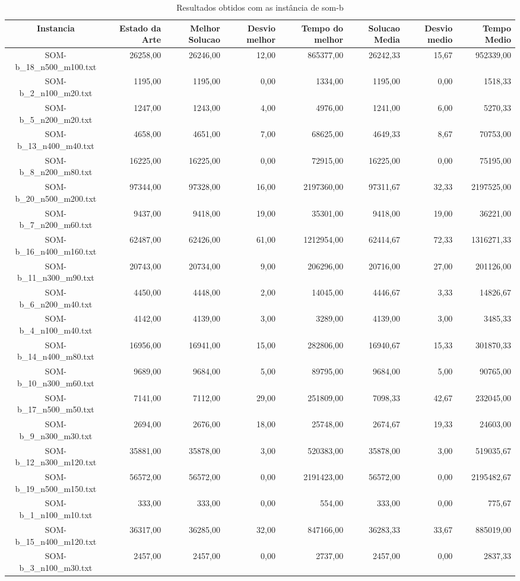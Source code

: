 \begin{landscape}
	\begin{table}[t]
	\centering
	\begin{tabular}{| c | r | r | r | r | r | r | r |  }
\hline
Instancia&Estado da Arte&Melhor Solucao&Desvio melhor&Tempo do melhor&Solucao Media&Desvio medio&Tempo Medio\\ \hline 
		SOM-b\_18\_n500\_m100.txt&26258,00&26246,00&12,00&865377,00&26242,33&15,67&952339,00\\
		SOM-b\_2\_n100\_m20.txt&1195,00&1195,00&0,00&1334,00&1195,00&0,00&1518,33\\
		SOM-b\_5\_n200\_m20.txt&1247,00&1243,00&4,00&4976,00&1241,00&6,00&5270,33\\
		SOM-b\_13\_n400\_m40.txt&4658,00&4651,00&7,00&68625,00&4649,33&8,67&70753,00\\
		SOM-b\_8\_n200\_m80.txt&16225,00&16225,00&0,00&72915,00&16225,00&0,00&75195,00\\
		SOM-b\_20\_n500\_m200.txt&97344,00&97328,00&16,00&2197360,00&97311,67&32,33&2197525,00\\
		SOM-b\_7\_n200\_m60.txt&9437,00&9418,00&19,00&35301,00&9418,00&19,00&36221,00\\
		SOM-b\_16\_n400\_m160.txt&62487,00&62426,00&61,00&1212954,00&62414,67&72,33&1316271,33\\
		SOM-b\_11\_n300\_m90.txt&20743,00&20734,00&9,00&206296,00&20716,00&27,00&201126,00\\
		SOM-b\_6\_n200\_m40.txt&4450,00&4448,00&2,00&14045,00&4446,67&3,33&14826,67\\
		SOM-b\_4\_n100\_m40.txt&4142,00&4139,00&3,00&3289,00&4139,00&3,00&3485,33\\
		SOM-b\_14\_n400\_m80.txt&16956,00&16941,00&15,00&282806,00&16940,67&15,33&301870,33\\
		SOM-b\_10\_n300\_m60.txt&9689,00&9684,00&5,00&89795,00&9684,00&5,00&90765,00\\
		SOM-b\_17\_n500\_m50.txt&7141,00&7112,00&29,00&251809,00&7098,33&42,67&232045,00\\
		SOM-b\_9\_n300\_m30.txt&2694,00&2676,00&18,00&25748,00&2674,67&19,33&24603,00\\
		SOM-b\_12\_n300\_m120.txt&35881,00&35878,00&3,00&520383,00&35878,00&3,00&519035,67\\
		SOM-b\_19\_n500\_m150.txt&56572,00&56572,00&0,00&2191423,00&56572,00&0,00&2195482,67\\
		SOM-b\_1\_n100\_m10.txt&333,00&333,00&0,00&554,00&333,00&0,00&775,67\\
		SOM-b\_15\_n400\_m120.txt&36317,00&36285,00&32,00&847166,00&36283,33&33,67&885019,00\\
		SOM-b\_3\_n100\_m30.txt&2457,00&2457,00&0,00&2737,00&2457,00&0,00&2837,33\\
\hline
	\end{tabular}
	\caption{Resultados obtidos com as instância de som-b}
	\label{tabela_som_b}
	\end{table}
\end{landscape}
